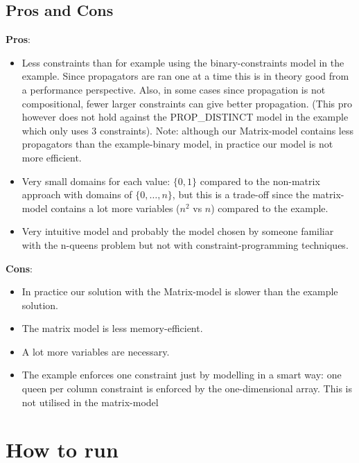 \documentclass[a4paper, 11pt]{article}
\begin{document}
\subsection*{Pros and Cons}
\textbf{Pros}:
\begin{itemize}
\item Less constraints than for example using the binary-constraints model in the example. Since propagators are ran one at a time this is in theory good from a performance perspective. Also, in some cases since propagation is not compositional, fewer larger constraints can give better propagation. (This pro however does not hold against the PROP\_DISTINCT model in the example which only uses $3$ constraints). Note: although our Matrix-model contains less propagators than the example-binary model, in practice our model is not more efficient.
\item Very small domains for each value: $\{0,1\}$ compared to the non-matrix approach with domains of $\{0, \ldots, n\}$, but this is a trade-off since the matrix-model contains a lot more variables ($n^2$ vs $n$) compared to the example.
\item Very intuitive model and probably the model chosen by someone familiar with the n-queens problem but not with constraint-programming techniques.
\end{itemize}
\textbf{Cons}:
\begin{itemize}
\item In practice our solution with the Matrix-model is slower than the example solution.
\item The matrix model is less memory-efficient.
\item A lot more variables are necessary.
\item The example enforces one constraint just by modelling in a smart way: one queen per column constraint is enforced by the one-dimensional array. This is not utilised in the matrix-model
\end{itemize}
\section*{How to run}
{}

\end{document}
